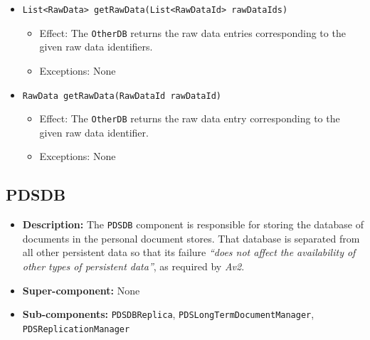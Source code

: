 \documentclass[a4paper,10pt]{article}
\begin{document}
\begin{itemize}
\begin{itemize}
        \item \texttt{List<RawData> getRawData(List<RawDataId> rawDataIds)}
        \begin{itemize}
            \item Effect: The \texttt{OtherDB} returns the raw data entries corresponding to the given raw data identifiers.
            \item Exceptions: None
        \end{itemize}
        
            \item \texttt{RawData getRawData(RawDataId rawDataId)}
        \begin{itemize}
            \item Effect: The \texttt{OtherDB} returns the raw data entry corresponding to the given raw data identifier.
            \item Exceptions: None
        \end{itemize}
    \end{itemize} 
    
\end{itemize}




\subsection{PDSDB}
\begin{itemize}
    \item \textbf{Description:} The \texttt{PDSDB} component is responsible for storing the database of documents in the personal document stores.  That database is separated from all other persistent data so that its failure \emph{``does not affect the availability of other types of persistent data''}, as required by \emph{Av2}.
    \item \textbf{Super-component:} None
    \item \textbf{Sub-components:} \texttt{PDSDBReplica}, \texttt{PDSLongTermDocumentManager}, \texttt{PDSReplicationManager}
\end{itemize}
\end{document}
